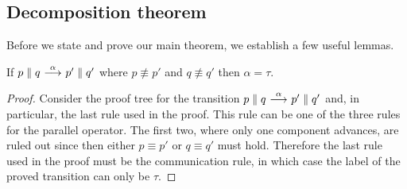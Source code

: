 \subsection{Decomposition theorem}\label{sub:theorem}

Before we state and prove our main theorem, we establish a few useful lemmas.

\begin{lemma}\label{lemma:both_step_means_tau}
    If $p\parallel q \ {\stackrel{{\alpha}}{\longrightarrow}}\  p'\parallel q'$ where $p\not\equiv p'$ and
    $q\not\equiv q'$ then $\alpha = \tau$.
\end{lemma}
\begin{proof}
    Consider the proof tree for the transition $p\parallel q \ {\stackrel{{\alpha}}{\longrightarrow}}\ 
    p'\parallel q'$ and, in particular, the last rule used in the proof. This
    rule can be one of the three rules for the parallel operator. The first two,
    where only one component advances, are ruled out since then either $p\equiv p'$
    or $q\equiv q'$ must hold. Therefore the last rule used in the proof
    must be the communication rule, in which case the
    label of the proved transition can only be $\tau$.
\end{proof}

